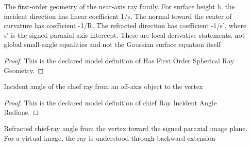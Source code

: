 \begin{definition}
  \label{def:physics:phyx-mini-0041:phyxminiproblems-problemphyxmini0041-hasfirstordersphericalraygeometry}
  The first-order geometry of the near-axis ray family. For surface height h, the incident direction has linear coefficient 1/s. The normal toward the center of curvature has coefficient -1/R. The refracted direction has coefficient -1/s', where s' is the signed paraxial axis intercept. These are local derivative statements, not global small-angle equalities and not the Gaussian surface equation itself
\end{definition}
\begin{proof}
  This is the declared model definition of Has First Order Spherical Ray Geometry.
\end{proof}
\begin{definition}
  \label{def:physics:phyx-mini-0041:phyxminiproblems-problemphyxmini0041-chiefrayincidentangleradians}
  Incident angle of the chief ray from an off-axis object to the vertex
\end{definition}
\begin{proof}
  This is the declared model definition of chief Ray Incident Angle Radians.
\end{proof}
\begin{definition}
  \label{def:physics:phyx-mini-0041:phyxminiproblems-problemphyxmini0041-chiefrayrefractedangleradians}
  Refracted chief-ray angle from the vertex toward the signed paraxial image plane. For a virtual image, the ray is understood through backward extension
\end{definition}
